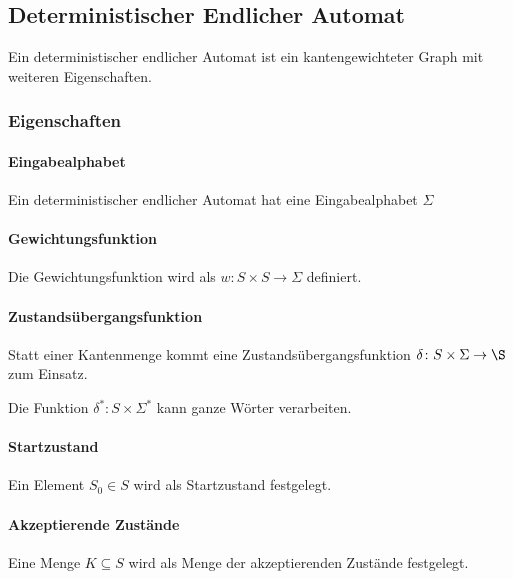 \documentclass[../main.tex]{subfiles}
\begin{document}
        \subsection[DEA]{Deterministischer Endlicher Automat}
            Ein deterministischer endlicher Automat ist ein kantengewichteter Graph mit weiteren Eigenschaften.
            
            \subsubsection{Eigenschaften}
                \paragraph{Eingabealphabet}
                    Ein deterministischer endlicher Automat hat eine Eingabealphabet $\Sigma$
                
                \paragraph{Gewichtungsfunktion}
                    Die Gewichtungsfunktion wird als $w\colon S \times S \rightarrow \Sigma$ definiert.
                    
                \paragraph{Zustandsübergangsfunktion}
                    Statt einer Kantenmenge kommt eine Zustandsübergangsfunktion $\delta\colon S \times \Sigma \rightarrow \S$ zum Einsatz.
                    
                    Die Funktion $\delta^*\colon S \times \Sigma^*$ kann ganze Wörter verarbeiten.
                    
                
                    
                \paragraph{Startzustand}
                    Ein Element $S_0 \in S$ wird als Startzustand festgelegt.
                
                \paragraph{Akzeptierende Zustände}
                    Eine Menge $K \subseteq S$ wird als Menge der akzeptierenden Zustände festgelegt.
                    
\end{document}

